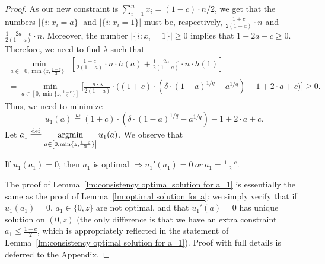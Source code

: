 \begin{proof}
As our new constraint is $\sum_{i=1}^n x_i = (1-c)\cdot n/2$, we get that the numbers $|\{i: x_i=a\}|$ and $|\{i: x_i=1\}|$ must be, respectively, $\frac{1+c}{2(1-a)}\cdot n$ and $\frac{1-2a-c}{2(1-a)}\cdot n$. Moreover, the number $|\{i: x_i=1\}|\geq 0$ implies that $1-2a-c\geq 0$. Therefore, we need to find $\lambda$ such that
\begin{multline}
    \label{eq: consistency optimization over a}   \min_{a\in\left[0,\min\{z,\frac{1-c}{2}\}\right]}\left[\frac{1+c}{2(1-a)}\cdot n\cdot h(a) + \frac{1-2a-c}{2(1-a)}\cdot n\cdot h(1)\right]\\
    =\min_{a\in\left[0,\min\{z,\frac{1-c}{2}\}\right]}\bigg[\frac{n\cdot\lambda}{2(1-a)}\cdot\Big((1+c)\cdot\left(\delta\cdot(1-a)^{1/q}-a^{1/q}\right)-1+2\cdot a+c\Big)\bigg]\ge 0.
\end{multline}
Thus, we need to minimize $$u_1(a)\eqdef(1+c)\cdot\left(\delta\cdot(1-a)^{1/q}-a^{1/q}\right)-1+2\cdot a+c.$$
Let $a_1\overset{\mathrm{def}}{=\mathrel{\mkern-3mu}=} \mathop{\rm argmin}\limits_{a\in\left[0,\min\{z,\frac{1-c}{2}\}\right]} u_1(a)$. We observe that
\begin{lemma}
    \label{lm:consistency optimal solution for a_1}
    If $u_1(a_1)=0$, then $a_1$ is optimal $\Rightarrow u_1'(a_1)=0\ or\ a_1=\frac{1-c}{2}$.
\end{lemma}
The proof of Lemma~\ref{lm:consistency optimal solution for a_1} is 
essentially the same as the proof of Lemma~\ref{lm:optimal solution for a}:
we simply verify that if $u_1(a_1)=0$, $a_1\in\{0,z\}$ are not optimal, and that $u_1'(a)=0$ has unique 
solution on $(0,z)$ (the only difference is that we have an extra constraint $a_1\le \frac{1-c}{2}$, which is appropriately reflected in the statement of Lemma~\ref{lm:consistency optimal solution for a_1}).
Proof with full details is deferred to the Appendix. 



\end{proof}

